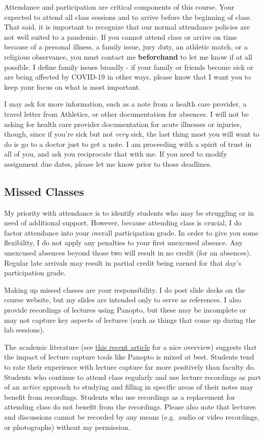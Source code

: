 \documentclass[
]{book}
\begin{document}
Attendance and participation are critical components of this course. Your expected to attend all class sessions and to arrive before the beginning of class. That said, it is important to recognize that our normal attendance policies are not well suited to a pandemic. If you cannot attend class or arrive on time because of a personal illness, a family issue, jury duty, an athletic match, or a religious observance, you must contact me \textbf{beforehand} to let me know if at all possible. I define family issues broadly - if your family or friends become sick or are being affected by COVID-19 in other ways, please know that I want you to keep your focus on what is most important.

I may ask for more information, such as a note from a health care provider, a travel letter from Athletics, or other documentation for absences. I will not be asking for health care provider documentation for acute illnesses or injuries, though, since if you're sick but not \emph{very} sick, the last thing most you will want to do is go to a doctor just to get a note. I am proceeding with a spirit of trust in all of you, and ask you reciprocate that with me. If you need to modify assignment due dates, please let me know prior to those deadlines.

\hypertarget{missed-classes}{%
\subsection{Missed Classes}\label{missed-classes}}

My priority with attendance is to identify students who may be struggling or in need of additional support. However, because attending class is crucial, I do factor attendance into your overall participation grade. In order to give you some flexibility, I do not apply any penalties to your first unexcused absence. Any unexcused absences beyond those two will result in no credit (for an absences). Regular late arrivals may result in partial credit being earned for that day's participation grade.

Making up missed classes are your responsibility. I do post slide decks on the course website, but my slides are intended only to serve as references. I also provide recordings of lectures using Panopto, but these may be incomplete or may not capture key aspects of lectures (such as things that come up during the lab sessions).

The academic literature (see \href{https://link.springer.com/article/10.1007/s10734-018-0275-9}{this recent article} for a nice overview) suggests that the impact of lecture capture tools like Panopto is mixed at best. Students tend to rate their experience with lecture capture far more positively than faculty do. Students who continue to attend class regularly and use lecture recordings as part of an \emph{active} approach to studying and filling in specific areas of their notes may benefit from recordings. Students who use recordings as a replacement for attending class do not benefit from the recordings. Please also note that lectures and discussions cannot be recorded by any means (e.g.~audio or video recordings, or photographs) without my permission.
\end{document}
